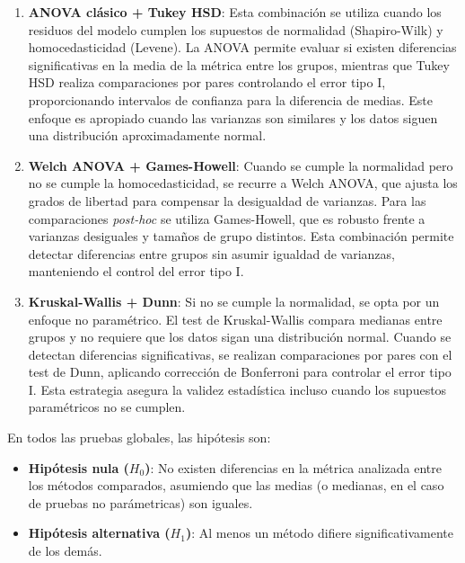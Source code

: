 \begin{enumerate}

    \item \textbf{ANOVA clásico + Tukey HSD}: Esta combinación se utiliza cuando los residuos del modelo cumplen los supuestos de normalidad (Shapiro-Wilk) y homocedasticidad (Levene). La ANOVA permite evaluar si existen diferencias significativas en la media de la métrica entre los grupos, mientras que Tukey HSD realiza comparaciones por pares controlando el error tipo I, proporcionando intervalos de confianza para la diferencia de medias. Este enfoque es apropiado cuando las varianzas son similares y los datos siguen una distribución aproximadamente normal.
    
    \item \textbf{Welch ANOVA + Games-Howell}: Cuando se cumple la normalidad pero no se cumple la homocedasticidad, se recurre a Welch ANOVA, que ajusta los grados de libertad para compensar la desigualdad de varianzas. Para las comparaciones \textit{post-hoc} se utiliza Games-Howell, que es robusto frente a varianzas desiguales y tamaños de grupo distintos. Esta combinación permite detectar diferencias entre grupos sin asumir igualdad de varianzas, manteniendo el control del error tipo I.
    
    \item \textbf{Kruskal-Wallis + Dunn}: Si no se cumple la normalidad, se opta por un enfoque no paramétrico. El test de Kruskal-Wallis compara medianas entre grupos y no requiere que los datos sigan una distribución normal. Cuando se detectan diferencias significativas, se realizan comparaciones por pares con el test de Dunn, aplicando corrección de Bonferroni para controlar el error tipo I. Esta estrategia asegura la validez estadística incluso cuando los supuestos paramétricos no se cumplen.
    
\end{enumerate}

En todos las pruebas globales, las hipótesis son:

\begin{itemize}
    \item \textbf{Hipótesis nula ($H_0$)}: No existen diferencias en la métrica analizada entre los métodos comparados, asumiendo que las medias (o medianas, en el caso de pruebas no parámetricas) son iguales.
    \item \textbf{Hipótesis alternativa ($H_1$)}: Al menos un método difiere significativamente de los demás.
\end{itemize}


